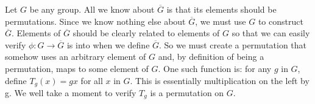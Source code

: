 \documentclass{article}
\begin{document}
Let $G$ be any group. All we know about $\overline{G}$ is that its elements should be permutations. Since we know nothing else about $\overline{G}$, we must use $G$ to construct $\overline{G}$. Elements of $\overline{G}$ should be clearly related to elements of $G$ so that we can easily verify $\phi\colon G \to \overline{G}$ is into when we define $\overline{G}$. So we must create a permutation that somehow uses an arbitrary element of $G$ and, by definition of being a permutation, maps to some element of $G$. One such function is: for any $g$ in $G$, define $T_g(x)=gx$ for all $x$ in $G$. This is essentially multiplication on the left by g. We well take a moment to verify $T_g$ is a permutation on $G$.
\end{document}

